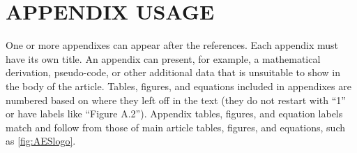 \documentclass[fleqn]{jaes}
\begin{document}









\appendix

\section{\MakeUppercase{Appendix usage}}
One or more appendixes can appear after the references. Each appendix must have its own title. An appendix can present, for example, a mathematical derivation, pseudo-code, or other additional data that is unsuitable to show in the body of the article. Tables, figures, and equations included in appendixes are numbered based on where they left off in the text (they do not restart with ``1'' or have labels like ``Figure A.2''). Appendix tables, figures, and equation labels match and follow from those of main article tables, figures, and equations, such as \cref{fig:AESlogo}.
\end{document}
